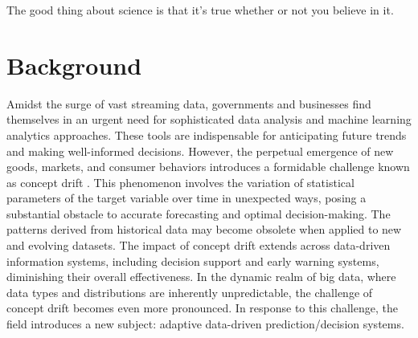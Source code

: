 



\begin{savequote}[50mm]
The good thing about science is that it's true whether or not you believe in it. 
\end{savequote}


\chapter{Background}
\label{cha:2_background}

Amidst the surge of vast streaming data, governments and businesses find themselves in an urgent need for sophisticated data analysis and machine learning analytics approaches. These tools are indispensable for anticipating future trends and making well-informed decisions. However, the perpetual emergence of new goods, markets, and consumer behaviors introduces a formidable challenge known as concept drift \cite{widmer1996learning}. This phenomenon involves the variation of statistical parameters of the target variable over time in unexpected ways, posing a substantial obstacle to accurate forecasting and optimal decision-making. The patterns derived from historical data may become obsolete when applied to new and evolving datasets.
The impact of concept drift extends across data-driven information systems, including decision support and early warning systems, diminishing their overall effectiveness. In the dynamic realm of big data, where data types and distributions are inherently unpredictable, the challenge of concept drift becomes even more pronounced. In response to this challenge, the field introduces a new subject: adaptive data-driven prediction/decision systems.
